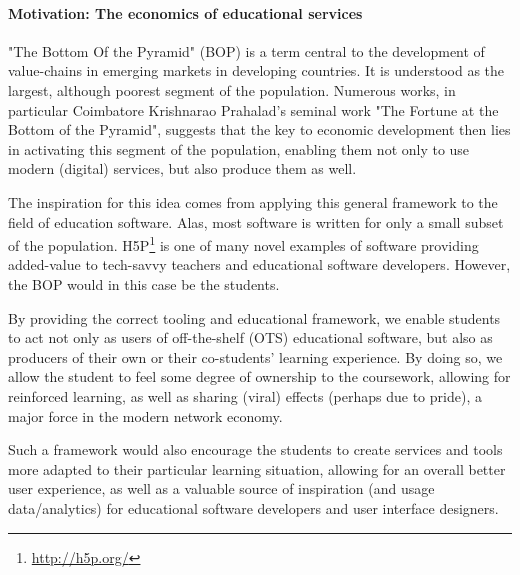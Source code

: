 \paragraph{Motivation: The economics of educational services}

"The Bottom Of the Pyramid" (BOP) is a term central to the development of
value-chains in emerging markets in developing countries. It is understood as
the largest, although poorest segment of the population. Numerous works, in
particular Coimbatore Krishnarao Prahalad's seminal work "The Fortune at the
Bottom of the Pyramid", suggests that the key to economic development then lies
in activating this segment of the population, enabling them not only to use
modern (digital) services, but also produce them as 
well\cite{prahalad2009fortune}.

The inspiration for this idea comes from applying this general framework to the
field of education software. Alas, most software is written for only a small
subset of the population. H5P\footnote{\url{http://h5p.org/}} is one of many 
novel examples of software providing added-value to tech-savvy teachers and 
educational software developers. However, the BOP would in this case be the 
students.

By providing the correct tooling and educational framework, we enable students
to act not only as users of off-the-shelf (OTS) educational software, but
also as producers of their own or their co-students' learning experience. By
doing so, we allow the student to feel some degree of ownership to the
coursework, allowing for reinforced learning, as well as sharing (viral) effects
(perhaps due to pride), a major force in the modern network economy.

Such a framework would also encourage the students to create services and tools
more adapted to their particular learning situation, allowing for an overall
better user experience, as well as a valuable source of inspiration (and usage
data/analytics) for educational software developers and user interface
designers.
